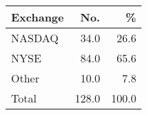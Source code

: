 \documentclass{article}
\begin{document}
\begin{tabular}{lrr}
\hline
Exchange&No.&\% \\
\hline
NASDAQ&34.0&26.6 \\
NYSE&84.0&65.6 \\
Other&10.0&7.8 \\
Total&128.0&100.0 \\
\hline
\end{tabular}
\end{document}
